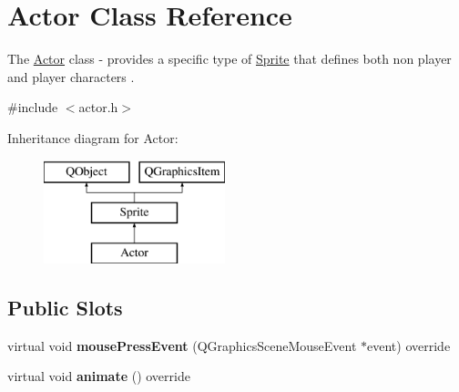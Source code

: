 \hypertarget{class_actor}{}\section{Actor Class Reference}
\label{class_actor}


The \hyperlink{class_actor}{Actor} class -\/ provides a specific type of \hyperlink{class_sprite}{Sprite} that defines both non player and player characters .  




{\ttfamily \#include $<$actor.\+h$>$}

Inheritance diagram for Actor\+:\begin{figure}[H]
\begin{center}
\leavevmode
\includegraphics[height=3.000000cm]{class_actor}
\end{center}
\end{figure}
\subsection*{Public Slots}
\begin{DoxyCompactItemize}
\item 
\mbox{\label{class_actor_abfb178899dad2f9e42f16280c7fe31e6}} 
virtual void {\bfseries mouse\+Press\+Event} (Q\+Graphics\+Scene\+Mouse\+Event $\ast$event) override
\item 
\mbox{\label{class_actor_ad1534650c6dbffefd97662ce24f1f82c}} 
virtual void {\bfseries animate} () override
\end{DoxyCompactItemize}
